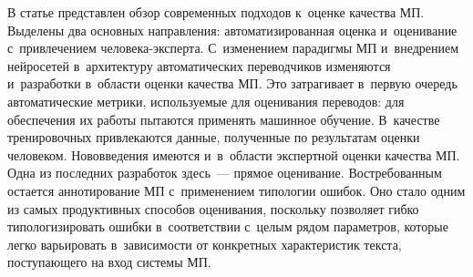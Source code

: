 \begin{multicols}{2}
  В статье представлен обзор современных подходов к~оценке качества 
МП. Выделены два основных направления: 
автоматизированная оценка и~оценивание с~привлечением че\-ло\-ве\-ка-экс\-пер\-та. 
С~изменением парадигмы МП и~внед\-ре\-ни\-ем нейросетей в~архитектуру 
автоматических переводчиков изменяются и~разработки в~области оценки 
качества МП. Это затрагивает в~первую очередь автоматические метрики, 
используемые для оценивания переводов: для обеспечения их работы 
пытаются применять машинное обучение. В~качестве тренировочных 
привлекаются данные, полученные по результатам оценки человеком. 
Нововведения имеются и~в~об\-ласти экспертной оценки качества МП. Одна 
из последних разработок здесь~--- прямое оценивание. Востребованным 
остается аннотирование МП с~применением типологии ошибок. Оно стало 
одним из самых продуктивных способов оценивания, поскольку позволяет 
гибко типологизировать ошибки в~соответствии с~целым рядом параметров, 
которые легко варьировать в~зависимости от конкретных характеристик 
текста, поступающего на вход системы МП.
  

\end{multicols}

